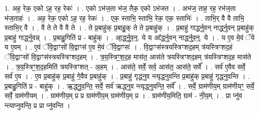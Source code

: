 \documentclass[17pt]{extarticle}
\begin{document}
1. अह॒ रेक॒ एको ऽह॒ रह॒ रेकः॑ । . एको ऽभ॑ज॒ता भ॑ज॒ तैक॒ एको ऽभ॑जत । . अभ॑ज॒ ताह॒ रह॒ रभ॑ज॒ता भ॑ज॒ताहः॑ । . अह॒ रेक॒ एको ऽह॒ रह॒ रेकः॑ । . एक॒ स्ताभि॒ स्ताभि॒ रेक॒ एक॒ स्ताभिः॑ । . ताभि॒र् वै वै ताभि॒ स्ताभि॒र् वै । . वै ते ते वै वै ते । . ते प्र॒बाहु॑क् प्र॒बाहु॒क् ते ते प्र॒बाहु॑क् । . प्र॒बाहु॑ गार्द्ध्नुवन् नार्द्ध्नुवन् प्र॒बाहु॑क् प्र॒बाहु॑ गार्द्ध्नुवन्न् । . प्र॒बाहु॒गिति॑ प्र - बाहु॑क् । . आ॒र्द्ध्नु॒व॒न्॒. ये य आ᳚र्द्ध्नुवन् नार्द्ध्नुव॒न्॒. ये । . य ए॒व मे॒वं ॅये य ए॒वम् । . ए॒वं ॅवि॒द्वाꣳसो॑ वि॒द्वाꣳस॑ ए॒व मे॒वं ॅवि॒द्वाꣳसः॑ । . वि॒द्वाꣳस॑स्त्रयस्त्रिꣳशद॒हम् त्र॑यस्त्रिꣳशद॒हं ॅवि॒द्वाꣳसो॑ वि॒द्वाꣳस॑स्त्रयस्त्रिꣳशद॒हम् । . त्र॒य॒स्त्रिꣳ॒॒श॒द॒ह मास॑त॒ आस॑ते त्रयस्त्रिꣳशद॒हम् त्र॑यस्त्रिꣳशद॒ह मास॑ते । . त्र॒य॒स्त्रिꣳ॒॒श॒द॒हमिति॑ त्रयस्त्रिꣳशत् - अ॒हम् । . आस॑ते॒ सर्वे॒ सर्व॒ आस॑त॒ आस॑ते॒ सर्वे᳚ । . सर्व॑ ए॒वैव सर्वे॒ सर्व॑ ए॒व । . ए॒व प्र॒बाहु॑क् प्र॒बाहु॑ गे॒वैव प्र॒बाहु॑क् । . प्र॒बाहु॑ गृद्ध्नुव न्त्यृद्ध्नुवन्ति प्र॒बाहु॑क् प्र॒बाहु॑ गृद्ध्नुवन्ति । . प्र॒बाहु॒गिति॑ प्र - बाहु॑क् । . ऋ॒द्ध्नु॒व॒न्ति॒ सर्वे॒ सर्व॑ ऋद्ध्नुव न्त्यृद्ध्नुवन्ति॒ सर्वे᳚ । . सर्वे॒ ग्राम॑णीय॒म् ग्राम॑णीयꣳ॒॒ सर्वे॒ सर्वे॒ ग्राम॑णीयम् । . ग्राम॑णीय॒म् प्र प्र ग्राम॑णीय॒म् ग्राम॑णीय॒म् प्र । . ग्राम॑णीय॒मिति॒ ग्राम॑ - नी॒य॒म् । . प्रा प्नु॑व न्त्याप्नुवन्ति॒ प्र प्रा प्नु॑वन्ति । \newline
\end{document}
